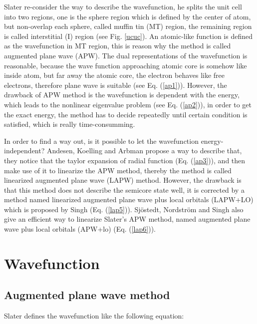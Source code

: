 \documentclass[a4paper, 12pt, titlepage,oneside,drop]{kthesis}
\begin{document}
\noindent Slater re-consider the way to describe the wavefunction, he splits the unit cell into two regions, one is the sphere region which is
defined by the center of atom, but non-overlap each sphere, called muffin tin (MT) region, the remaining region is called interstitial 
(I) region (see Fig. \ref{ucuc}). An atomic-like function is defined as the wavefunction in MT region, this is reason why the method is called augmented plane wave (APW).
The dual representations of the wavefunction is reasonable, because the wave function approaching atomic core is somehow like inside atom, but far away the atomic core, the electron behaves like free electrons,
therefore plane wave is suitable (see Eq. (\ref{ap1})). However, the drawback of APW method is the wavefunction is dependent with the energy, which leads to the 
nonlinear eigenvalue problem (see Eq. (\ref{ap2})), in order to get the exact energy, the method has to decide repeatedly until certain condition is satisfied,
which is really time-consumming.

\noindent In order to find a way out, is it possible to let the wavefunction energy-independent? Andesen, Koelling and Arbman propose a way to describe that,
they notice that the taylor expansion of radial function (Eq. (\ref{ap3})), and then make use of it to linearize the APW method, thereby the method is called linearized augmented plane wave (LAPW)
method. However, the drawback is that this method does not describe the semicore state well, it is corrected by a method named linearized augmented plane wave plus local orbitals (LAPW+LO) which is proposed by Singh (Eq. (\ref{lap5})).
Sjöstedt, Nordström and Singh also give an efficient way to linearize Slater's APW method, named augmented plane wave plus local orbitals (APW+lo) (Eq. (\ref{lap6})).



\section{Wavefunction}
\subsection{Augmented plane wave method}
\noindent Slater defines the wavefunction like the following equation:

\end{document}
